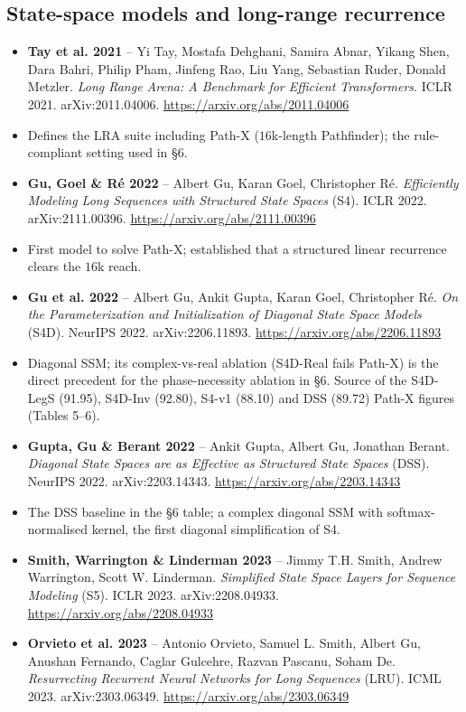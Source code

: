\documentclass[11pt,a4paper]{article}
\theoremstyle{plain}
\theoremstyle{definition}
\begin{document}
\subsection*{State-space models and long-range recurrence}
\begin{itemize}
  \item \textbf{Tay et al. 2021} -- Yi Tay, Mostafa Dehghani, Samira Abnar, Yikang Shen, Dara Bahri, Philip Pham, Jinfeng Rao, Liu Yang, Sebastian Ruder, Donald Metzler. \emph{Long Range Arena: A Benchmark for Efficient Transformers}. ICLR 2021. arXiv:2011.04006. \url{https://arxiv.org/abs/2011.04006}
  \item Defines the LRA suite including Path-X ($16$k-length Pathfinder); the rule-compliant setting used in \S{}6.
  \item \textbf{Gu, Goel \& Ré 2022} -- Albert Gu, Karan Goel, Christopher Ré. \emph{Efficiently Modeling Long Sequences with Structured State Spaces} (S4). ICLR 2022. arXiv:2111.00396. \url{https://arxiv.org/abs/2111.00396}
  \item First model to solve Path-X; established that a structured linear recurrence clears the $16$k reach.
  \item \textbf{Gu et al. 2022} -- Albert Gu, Ankit Gupta, Karan Goel, Christopher Ré. \emph{On the Parameterization and Initialization of Diagonal State Space Models} (S4D). NeurIPS 2022. arXiv:2206.11893. \url{https://arxiv.org/abs/2206.11893}
  \item Diagonal SSM; its complex-vs-real ablation (S4D-Real fails Path-X) is the direct precedent for the phase-necessity ablation in \S{}6. Source of the S4D-LegS (91.95), S4D-Inv (92.80), S4-v1 (88.10) and DSS (89.72) Path-X figures (Tables 5--6).
  \item \textbf{Gupta, Gu \& Berant 2022} -- Ankit Gupta, Albert Gu, Jonathan Berant. \emph{Diagonal State Spaces are as Effective as Structured State Spaces} (DSS). NeurIPS 2022. arXiv:2203.14343. \url{https://arxiv.org/abs/2203.14343}
  \item The DSS baseline in the \S{}6 table; a complex diagonal SSM with softmax-normalised kernel, the first diagonal simplification of S4.
  \item \textbf{Smith, Warrington \& Linderman 2023} -- Jimmy T.H. Smith, Andrew Warrington, Scott W. Linderman. \emph{Simplified State Space Layers for Sequence Modeling} (S5). ICLR 2023. arXiv:2208.04933. \url{https://arxiv.org/abs/2208.04933}
  \item \textbf{Orvieto et al. 2023} -- Antonio Orvieto, Samuel L. Smith, Albert Gu, Anushan Fernando, Caglar Gulcehre, Razvan Pascanu, Soham De. \emph{Resurrecting Recurrent Neural Networks for Long Sequences} (LRU). ICML 2023. arXiv:2303.06349. \url{https://arxiv.org/abs/2303.06349}

\end{itemize}
\end{document}
